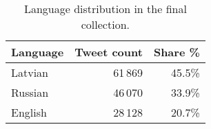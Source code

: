 \begin{table}[ht]
  \centering
  \begin{tabular}{lrr}
    \toprule
    Language & Tweet count & Share \% \\
    \midrule
    Latvian     & 61\,869  & 45.5\%  \\
    Russian     & 46\,070  & 33.9\%  \\
    English     & 28\,128  & 20.7\%  \\
    \bottomrule
  \end{tabular}
  \caption{Language distribution in the final collection.}
  \label{tab:language-counts}
\end{table}